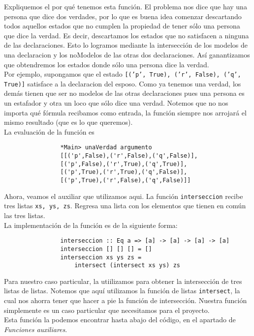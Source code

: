 \documentclass[letterpaper,11pt]{article}
\begin{document}
\begin{itemize}
\begin{itemize}
            Expliquemos el por qué tenemos esta función. El problema nos dice 
            que hay una persona que dice dos verdades, por lo que es buena idea
            comenzar descartando todos aquellos estados que no cumplen la 
            propiedad de tener sólo una persona que dice la verdad. Es decir, 
            descartamos los estados que no satisfacen a ninguna de las 
            declaraciones. Esto lo logramos mediante la intersección de los 
            modelos de una declaracion y los noModelos de las otras dos 
            declaraciones. Así ganantizamos que obtendremos los estados 
            donde sólo una persona dice la verdad. \\
            Por ejemplo, supongamos que el estado 
            \texttt{[('p', True), ('r', False), ('q', True)]} satisface a la
            declaracion del esposo. Como ya tenemos una verdad, los demás 
            tienen que ser no modelos de las otras declaraciones pues una 
            persona es un estafador y otra un loco que sólo dice una verdad.
            Notemos que no nos importa qué fórmula recibamos como entrada, 
            la función siempre nos arrojará el mismo resultado (que es lo que 
            queremos). \\
            La evaluación de la función es
            \begin{lstlisting}
                *Main> unaVerdad argumento
                [[('p',False),('r',False),('q',False)],
                [('p',False),('r',True),('q',True)],
                [('p',True),('r',True),('q',False)],
                [('p',True),('r',False),('q',False)]]
            \end{lstlisting}

            Ahora, veamos el auxiliar que utilizamos aqui. La función 
            \texttt{interseccion} recibe tres listas \texttt{xs, ys, zs}. 
            Regresa una lista con los elementos que tienen en común las tres
            listas. \\
            La implementación de la función es de la siguiente forma:
            \begin{lstlisting}
                interseccion :: Eq a => [a] -> [a] -> [a] -> [a]
                interseccion [] [] [] = [] 
                interseccion xs ys zs = 
                    intersect (intersect xs ys) zs
            \end{lstlisting}

            Para nuestro caso particular, la utiilizamos para obtener la 
            intersección de tres listas de listas. Notemos que aquí 
            utilizamos la función de listas \texttt{intersect}, la cual 
            nos ahorra tener que hacer a pie la función de intersección.
            Nuestra función simplemente es un caso particular que 
            necesitamos para el proyecto. \\
            Esta función la podemos encontrar hasta abajo del código, en el 
            apartado de \textit{Funciones auxiliares}.
        \end{itemize}


\end{itemize}
\end{document}
